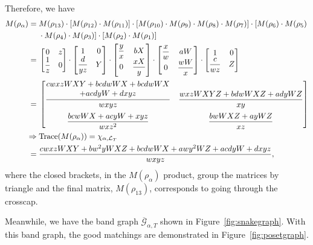 \documentclass[10pt,a4paper]{amsart}
\numberwithin{equation}{section}
\theoremstyle{definition}
\begin{document}
Therefore, we have
\begin{align*}
 M( \rho _{\alpha }) ={}&M( \rho _{13}) \cdot [ M( \rho _{12}) \cdot M( \rho _{11})] \cdot [ M( \rho _{10}) \cdot M( \rho _{9}) \cdot M( \rho _{8}) \cdot M( \rho _{7})] \cdot [ M( \rho _{6}) \cdot M( \rho _{5}) \\
&	\cdot	M( \rho _{4}) \cdot M( \rho _{3})] \cdot [ M( \rho _{2}) \cdot M( \rho _{1})]
\\
={}&\begin{bmatrix}
0 & z\\
\dfrac{1}{z} & 0
\end{bmatrix} \cdot \begin{bmatrix}
1 & 0\\
\dfrac{d}{yz} & Y
\end{bmatrix} \cdot \begin{bmatrix}
\dfrac{y}{x} & bX\\
0 & \dfrac{xX}{y}
\end{bmatrix} \cdot \begin{bmatrix}
\dfrac{x}{w} & aW\\
0 & \dfrac{wW}{x}
\end{bmatrix} \cdot \begin{bmatrix}
1 & 0\\
\dfrac{c}{wz} & Z
\end{bmatrix}
\\
={}&\begin{bmatrix}
\dfrac{\begin{array}{@{}c@{}} cwxzWXY+bcdwWX+bcdwWX\\ +acdyW+dxyz\end{array}}{wxyz} & \dfrac{wxzWXYZ+bdwWXZ+adyWZ}{xy}\vspace{2mm}\\
\dfrac{bcwWX+acyW+xyz}{wxz^{2}} & \dfrac{bwWXZ+ayWZ}{xz}
\end{bmatrix}
\\
\Rightarrow{}& \mathbf{\text{Trace}}( M( \rho _{\alpha }))=\chi_{\alpha, \mathcal{L}_T} \\
={}&\frac{cwxzWXY+bw^{2} yWXZ+bcdwWX+awy^{2} WZ+acdyW+dxyz}{wxyz},
\end{align*}
where the closed brackets, in the $M(\rho_{\alpha})$ product, group the matrices by
triangle and the final matrix, $M(\rho_{13})$, corresponds to going through the crosscap.

Meanwhile, we have the band graph $\overline{\mathcal{G}}_{\alpha, T}$ shown in Figure~\ref{fig:snakegraph}. With this band graph, the good matchings are demonstrated in Figure~\ref{fig:posetgraph}.
\end{document}
